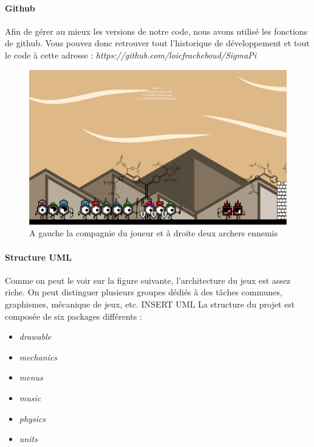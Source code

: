 \documentclass[a4paper,10pt]{article}
\begin{document}
  \paragraph{Github}
  Afin de gérer au mieux les versions de notre code, nous avons utilisé les fonctions de github. Vous pouvez donc retrouver tout l'historique de développement et tout le code à cette adresse : {\itshape https://github.com/loicfracheboud/SigmaPi}
  \begin{figure}[!h]
 \centering
 \vspace{-5pt}
 \includegraphics[scale=0.2]{images/menu}
 \caption{A gauche la compagnie du joueur et à droite deux archers ennemis}
 \end{figure}  
  \pagebreak
  
  \paragraph*{Structure UML}
  Comme on peut le voir sur la figure suivante, l'architecture du jeux est assez riche. On peut distinguer plusieurs groupes dédiés à des tâches communes, graphismes, mécanique de jeux, etc. INSERT UML
  \newline La structure du projet est composée de six packages différents :\begin{itemize}
  \item {\itshape drawable}
  \item {\itshape mechanics}
  \item {\itshape menus}
  \item {\itshape music}
  \item {\itshape physics}
  \item {\itshape units}
  \end{itemize}
\end{document}
